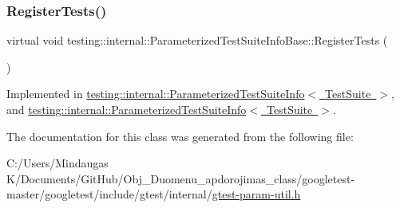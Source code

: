 \mbox{\label{classtesting_1_1internal_1_1_parameterized_test_suite_info_base_a41d7d663014af0c1e614c5a61293cb5a}} 
\subsubsection{\texorpdfstring{RegisterTests()}{RegisterTests()}\hspace{0.1cm}{\footnotesize\ttfamily [2/2]}}
{\footnotesize\ttfamily virtual void testing\+::internal\+::\+Parameterized\+Test\+Suite\+Info\+Base\+::\+Register\+Tests (\begin{DoxyParamCaption}{ }\end{DoxyParamCaption})\hspace{0.3cm}{\ttfamily [pure virtual]}}



Implemented in \mbox{\hyperlink{classtesting_1_1internal_1_1_parameterized_test_suite_info_a8c0af866d3c291a63d3f4581ccd452d1}{testing\+::internal\+::\+Parameterized\+Test\+Suite\+Info$<$ Test\+Suite $>$}}, and \mbox{\hyperlink{classtesting_1_1internal_1_1_parameterized_test_suite_info_a8c0af866d3c291a63d3f4581ccd452d1}{testing\+::internal\+::\+Parameterized\+Test\+Suite\+Info$<$ Test\+Suite $>$}}.



The documentation for this class was generated from the following file\+:\begin{DoxyCompactItemize}
\item 
C\+:/\+Users/\+Mindaugas K/\+Documents/\+Git\+Hub/\+Obj\+\_\+\+Duomenu\+\_\+apdorojimas\+\_\+class/googletest-\/master/googletest/include/gtest/internal/\mbox{\hyperlink{googletest-master_2googletest_2include_2gtest_2internal_2gtest-param-util_8h}{gtest-\/param-\/util.\+h}}\end{DoxyCompactItemize}
